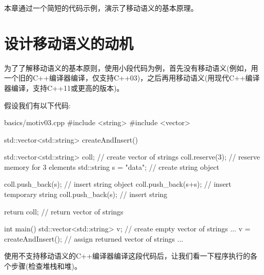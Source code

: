 
本章通过一个简短的代码示例，演示了移动语义的基本原理。\par


\section{设计移动语义的动机}

为了了解移动语义的基本原则，使用小段代码为例，首先没有移动语义(例如，用一个旧的C++编译器编译，仅支持C++03)，之后再用移动语义(用现代C++编译器编译，支持C++11或更高的版本)。\par


假设我们有以下代码:\par

\begin{codeboxt}[cpp]{basics/motiv03.cpp}
#include <string>
#include <vector>

std::vector<std::string> createAndInsert()
{
  std::vector<std::string> coll; // create vector of strings
  coll.reserve(3); // reserve memory for 3 elements
  std::string s = "data"; // create string object

  coll.push_back(s); // insert string object
  coll.push_back(s+s); // insert temporary string
  coll.push_back(s); // insert string

  return coll; // return vector of strings
}

int main()
{
  std::vector<std::string> v; // create empty vector of strings
  ...
  v = createAndInsert(); // assign returned vector of strings
  ...
}
\end{codeboxt}

使用不支持移动语义的C++编译器编译这段代码后，让我们看一下程序执行的各个步骤(检查堆栈和堆)。\par

